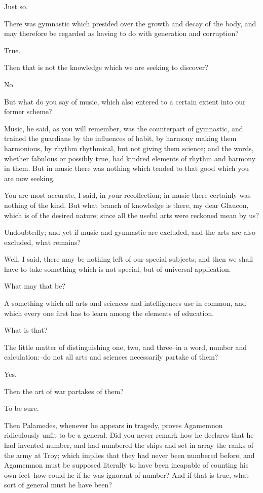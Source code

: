 Just so.

There was gymnastic which presided over the growth and decay of the
body, and may therefore be regarded as having to do with generation and
corruption?

True.

Then that is not the knowledge which we are seeking to discover?

No.

But what do you say of music, which also entered to a certain extent
into our former scheme?

Music, he said, as you will remember, was the counterpart of gymnastic,
and trained the guardians by the influences of habit, by harmony making
them harmonious, by rhythm rhythmical, but not giving them science; and
the words, whether fabulous or possibly true, had kindred elements of
rhythm and harmony in them. But in music there was nothing which tended
to that good which you are now seeking.

You are most accurate, I said, in your recollection; in music there
certainly was nothing of the kind. But what branch of knowledge is
there, my dear Glaucon, which is of the desired nature; since all the
useful arts were reckoned mean by us?

Undoubtedly; and yet if music and gymnastic are excluded, and the arts
are also excluded, what remains?

Well, I said, there may be nothing left of our special subjects; and
then we shall have to take something which is not special, but of
universal application.

What may that be?

A something which all arts and sciences and intelligences use in common,
and which every one first has to learn among the elements of education.

What is that?

The little matter of distinguishing one, two, and three--in a word,
number and calculation:--do not all arts and sciences necessarily
partake of them?

Yes.

Then the art of war partakes of them?

To be sure.

Then Palamedes, whenever he appears in tragedy, proves Agamemnon
ridiculously unfit to be a general. Did you never remark how he declares
that he had invented number, and had numbered the ships and set in array
the ranks of the army at Troy; which implies that they had never been
numbered before, and Agamemnon must be supposed literally to have been
incapable of counting his own feet--how could he if he was ignorant of
number? And if that is true, what sort of general must he have been?

